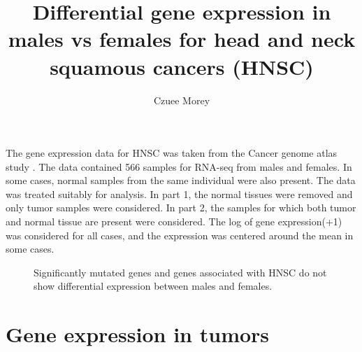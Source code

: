 \documentclass[11pt]{article} %
\title{Differential gene expression in males vs females for head and neck squamous cancers (HNSC)}
\author{Czuee Morey}
\begin{document}
\maketitle

The gene expression data for HNSC was taken from the Cancer genome atlas study \cite{nature}. The data contained 566 samples for RNA-seq from males and females. In some cases, normal samples from the same individual were also present. The data was treated suitably for analysis. In part 1, the normal tissues were removed and only tumor samples were considered. In part 2, the samples for which both tumor and normal tissue are present were considered. The log of gene expression(+1) was considered for all cases, and the expression was centered around the mean in some cases.

\begin{figure}[htbp]
\centering
{}
\caption{Significantly mutated genes \cite{nature} and genes associated with HNSC \cite{pone} do not show differential expression between males and females.}
\label{mutsig}
\end{figure}

\section{Gene expression in tumors}
\end{document}
